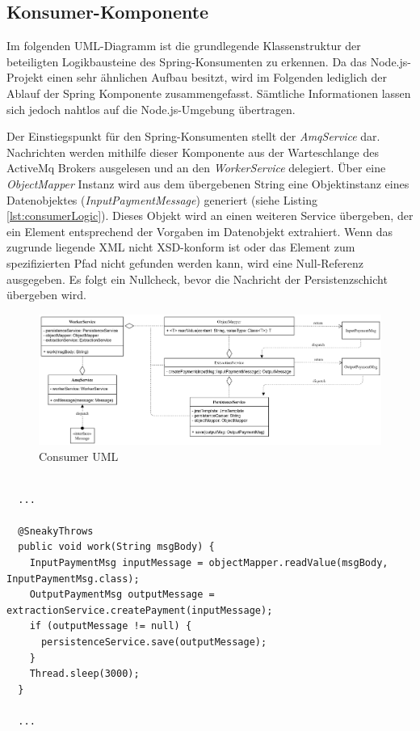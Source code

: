 \subsection{Konsumer-Komponente}

Im folgenden UML-Diagramm ist die grundlegende Klassenstruktur der beteiligten Logikbausteine des Spring-Konsumenten zu erkennen. Da das Node.js-Projekt einen sehr ähnlichen Aufbau besitzt, wird im Folgenden lediglich der Ablauf der Spring Komponente zusammengefasst. Sämtliche Informationen lassen sich jedoch nahtlos auf die Node.js-Umgebung übertragen. 

Der Einstiegspunkt für den Spring-Konsumenten stellt der \emph{AmqService} dar. Nachrichten werden mithilfe dieser Komponente aus der Warteschlange des ActiveMq Brokers ausgelesen und an den \emph{WorkerService} delegiert. Über eine \emph{ObjectMapper} Instanz wird aus dem übergebenen String eine Objektinstanz eines Datenobjektes (\emph{InputPaymentMessage}) generiert (siehe Listing \ref{lst:consumerLogic}). Dieses Objekt wird an einen weiteren Service übergeben, der ein Element entsprechend der Vorgaben im Datenobjekt extrahiert. Wenn das zugrunde liegende XML nicht XSD-konform ist oder das Element zum spezifizierten Pfad nicht gefunden werden kann, wird eine Null-Referenz ausgegeben. Es folgt ein Nullcheck, bevor die Nachricht der Persistenzschicht übergeben wird.

\begin{figure}[b!]
	\centering
	\includegraphics[width=\linewidth]{kapitel/problemloesung/implementierung/_img/consumer-uml}
	\caption[Consumer UML]{Consumer UML}
	\label{fig:consumerUml}
\end{figure}

\begin{minipage}{\linewidth}
\begin{lstlisting}[style=javaStyle,caption={WorkerService - Konsumer Logik},label=lst:consumerLogic]

  ...

  @SneakyThrows
  public void work(String msgBody) {
    InputPaymentMsg inputMessage = objectMapper.readValue(msgBody, InputPaymentMsg.class);
    OutputPaymentMsg outputMessage = extractionService.createPayment(inputMessage);
    if (outputMessage != null) {
      persistenceService.save(outputMessage);
    }
    Thread.sleep(3000);
  }

  ...

\end{lstlisting}
\end{minipage}

